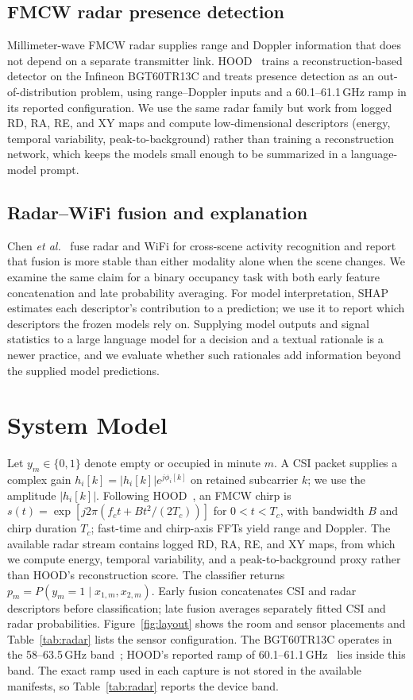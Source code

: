 \documentclass[conference,10pt,letterpaper]{IEEEtran}
\begin{document}
\subsection{FMCW radar presence detection}
Millimeter-wave FMCW radar supplies range and Doppler information that does not depend on a separate transmitter link. HOOD~\cite{hood} trains a reconstruction-based detector on the Infineon BGT60TR13C and treats presence detection as an out-of-distribution problem, using range--Doppler inputs and a 60.1--61.1\,GHz ramp in its reported configuration. We use the same radar family but work from logged RD, RA, RE, and XY maps and compute low-dimensional descriptors (energy, temporal variability, peak-to-background) rather than training a reconstruction network, which keeps the models small enough to be summarized in a language-model prompt.

\subsection{Radar--WiFi fusion and explanation}
Chen \emph{et al.}~\cite{fusion} fuse radar and WiFi for cross-scene activity recognition and report that fusion is more stable than either modality alone when the scene changes. We examine the same claim for a binary occupancy task with both early feature concatenation and late probability averaging. For model interpretation, SHAP~\cite{shap} estimates each descriptor's contribution to a prediction; we use it to report which descriptors the frozen models rely on. Supplying model outputs and signal statistics to a large language model for a decision and a textual rationale is a newer practice, and we evaluate whether such rationales add information beyond the supplied model predictions.

\section{System Model}
Let $y_m\in\{0,1\}$ denote empty or occupied in minute $m$. A CSI packet supplies a complex gain $h_i[k]=|h_i[k]|e^{j\phi_i[k]}$ on retained subcarrier $k$; we use the amplitude $|h_i[k]|$. Following HOOD~\cite{hood}, an FMCW chirp is $s(t)=\exp[j2\pi(f_ct+Bt^2/(2T_c))]$ for $0<t<T_c$, with bandwidth $B$ and chirp duration $T_c$; fast-time and chirp-axis FFTs yield range and Doppler. The available radar stream contains logged RD, RA, RE, and XY maps, from which we compute energy, temporal variability, and a peak-to-background proxy rather than HOOD's reconstruction score. The classifier returns $p_m=P(y_m=1\mid x_{1,m},x_{2,m})$. Early fusion concatenates CSI and radar descriptors before classification; late fusion averages separately fitted CSI and radar probabilities. Figure~\ref{fig:layout} shows the room and sensor placements and Table~\ref{tab:radar} lists the sensor configuration. The BGT60TR13C operates in the 58--63.5\,GHz band~\cite{bgt60}; HOOD's reported ramp of 60.1--61.1\,GHz~\cite{hood} lies inside this band. The exact ramp used in each capture is not stored in the available manifests, so Table~\ref{tab:radar} reports the device band.
\end{document}
